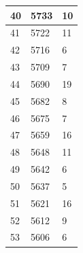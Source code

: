 \documentclass{article}
\begin{document}
\begin{center}
\begin{longtable}{|l|l|l|}
		\hline
		40                                                        & 5733                                                               & 10      \\ 
		\hline
		41                                                        & 5722                                                               & 11      \\ 
		\hline
		42                                                        & 5716                                                               & 6       \\ 
		\hline
		43                                                        & 5709                                                               & 7       \\ 
		\hline
		44                                                        & 5690                                                               & 19      \\ 
		\hline
		45                                                        & 5682                                                               & 8       \\ 
		\hline
		46                                                        & 5675                                                               & 7       \\ 
		\hline
		47                                                        & 5659                                                               & 16      \\ 
		\hline
		48                                                        & 5648                                                               & 11      \\ 
		\hline
		49                                                        & 5642                                                               & 6       \\ 
		\hline
		50                                                        & 5637                                                               & 5       \\ 
		\hline
		51                                                        & 5621                                                               & 16      \\ 
		\hline
		52                                                        & 5612                                                               & 9       \\ 
		\hline
		53                                                        & 5606                                                               & 6       \\ 

\end{longtable}
\end{center}
\end{document}
